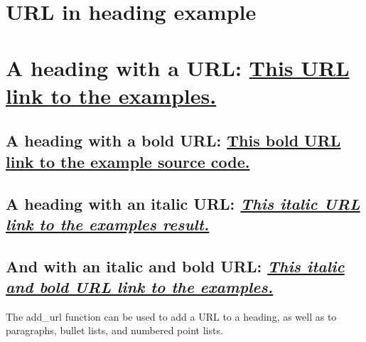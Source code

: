 \documentclass[a4paper]{report}
\begin{document}
\chapter{URL in heading example}

\chapter{A heading with a URL: \href{https://github.com/tom-bjorkholm/mformat/blob/master/example}{This URL link to the examples.}}

\section{A heading with a bold URL: \textbf{\href{https://github.com/tom-bjorkholm/mformat/blob/master/example/src}{This bold URL link to the example source code.}}}

\section{A heading with an italic URL: \textit{\href{https://github.com/tom-bjorkholm/mformat/blob/master/example/result}{This italic URL link to the examples result.}}}

\section{And with an italic and bold URL: \textit{\textbf{\href{https://github.com/tom-bjorkholm/mformat/blob/master/example/src}{This italic and bold URL link to the examples.}}}}

The add\_url function can be used to add a URL to a heading, as well as to paragraphs, bullet lists, and numbered point lists.
\end{document}
